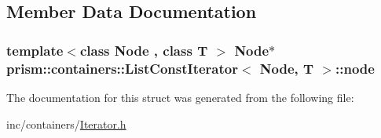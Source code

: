 \subsection{Member Data Documentation}
\subsubsection[{\texorpdfstring{node}{node}}]{\setlength{\rightskip}{0pt plus 5cm}template$<$class Node , class T $>$ Node$\ast$ {\bf prism\+::containers\+::\+List\+Const\+Iterator}$<$ Node, T $>$\+::node}\hypertarget{structprism_1_1containers_1_1_list_const_iterator_ab430437e0a8fb4c69e208a2033c3ac3d}{}\label{structprism_1_1containers_1_1_list_const_iterator_ab430437e0a8fb4c69e208a2033c3ac3d}


The documentation for this struct was generated from the following file\+:\begin{DoxyCompactItemize}
\item 
inc/containers/\hyperlink{_iterator_8h}{Iterator.\+h}\end{DoxyCompactItemize}
